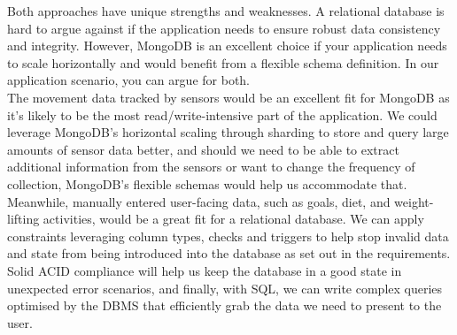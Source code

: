 \documentclass{article}
\begin{document}
\newline
Both approaches have unique strengths and weaknesses. A relational database is hard to argue against if the application needs to ensure robust data consistency and integrity. However, MongoDB is an excellent choice if your application needs to scale horizontally and would benefit from a flexible schema definition. In our application scenario, you can argue for both. \\
\newline
The movement data tracked by sensors would be an excellent fit for MongoDB as it's likely to be the most read/write-intensive part of the application. We could leverage MongoDB's horizontal scaling through sharding to store and query large amounts of sensor data better, and should we need to be able to extract additional information from the sensors or want to change the frequency of collection, MongoDB's flexible schemas would help us accommodate that. \\
\newline
Meanwhile, manually entered user-facing data, such as goals, diet, and weight-lifting activities, would be a great fit for a relational database. We can apply constraints leveraging column types, checks and triggers to help stop invalid data and state from being introduced into the database as set out in the requirements. Solid ACID compliance will help us keep the database in a good state in unexpected error scenarios, and finally, with SQL, we can write complex queries optimised by the DBMS that efficiently grab the data we need to present to the user.\\
\end{document}
